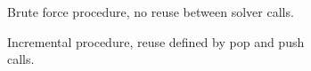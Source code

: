 \begin{figure}[h]
  \begin{subfigure}[t]{.45\textwidth}
    
    \caption{Brute force procedure, no reuse between solver calls.}%
    \label{fig:bkg:bf}
  \end{subfigure}%
  \vfill
  \begin{subfigure}[t]{.45\textwidth}
    
    \caption{Incremental procedure, reuse defined by pop and push calls.}%
    \label{fig:bkg:inc}
  \end{subfigure}
  \caption{}%
  \label{fig:bkg}
\end{figure}